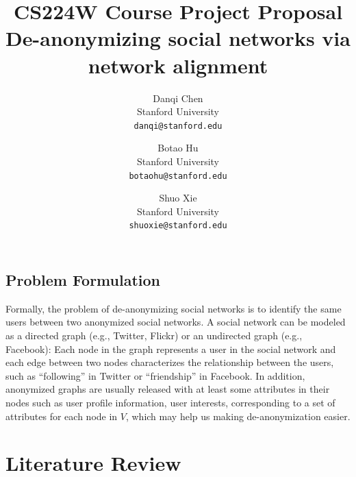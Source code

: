 \documentclass[11pt,letterpaper]{article}
\begin{document}
\title{{CS224W Course Project Proposal \\} \bf De-anonymizing social networks via network alignment}

\author{Danqi Chen\\
Stanford University\\
{\tt\small danqi@stanford.edu}
\and
Botao Hu\\
Stanford University\\
{\tt\small botaohu@stanford.edu}
%
\and
Shuo Xie\\
Stanford University\\
{\tt\small shuoxie@stanford.edu}
}

\maketitle
\thispagestyle{empty}

\maketitle



\subsection{Problem Formulation}
Formally, the problem of de-anonymizing social networks is to identify the same users between two anonymized social networks.  A social network can be modeled as a directed graph (e.g., Twitter, Flickr) or an undirected graph (e.g., Facebook): Each node in the graph represents a user in the social network and each edge between two nodes characterizes the relationship between the users, such as ``following'' in Twitter or ``friendship'' in Facebook. In addition, anonymized graphs are usually released with at least some attributes in their nodes such as user profile information, user interests, corresponding to a set of attributes for each node in $V$, which may help us making de-anonymization easier.

\section{Literature Review}
\end{document}
